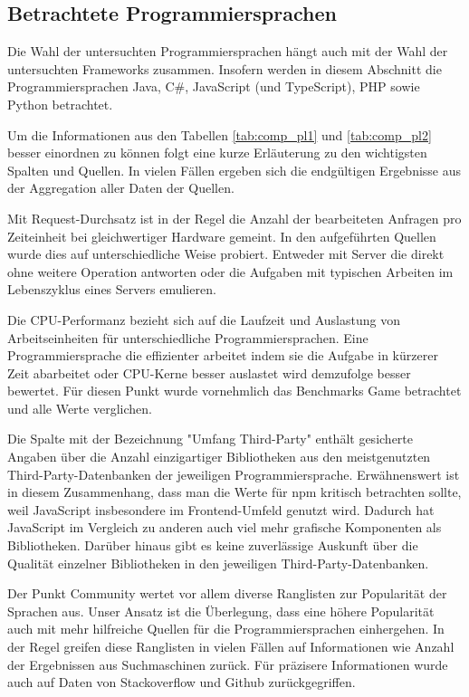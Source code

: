 \subsection{Betrachtete Programmiersprachen}
Die Wahl der untersuchten Programmiersprachen hängt auch mit der Wahl der untersuchten Frameworks zusammen. Insofern werden in diesem Abschnitt die Programmiersprachen Java, C\#, JavaScript (und TypeScript), PHP sowie Python betrachtet.

Um die Informationen aus den Tabellen \ref{tab:comp_pl1} und \ref{tab:comp_pl2} besser einordnen zu können folgt eine kurze Erläuterung zu den wichtigsten Spalten und Quellen. In vielen Fällen ergeben sich die endgültigen Ergebnisse aus der Aggregation aller Daten der Quellen.

Mit Request-Durchsatz ist in der Regel die Anzahl der bearbeiteten Anfragen pro Zeiteinheit bei gleichwertiger Hardware gemeint. In den aufgeführten Quellen wurde dies auf unterschiedliche Weise probiert. Entweder mit Server die direkt ohne weitere Operation antworten oder die Aufgaben mit typischen Arbeiten im Lebenszyklus eines Servers emulieren.

Die CPU-Performanz bezieht sich auf die Laufzeit und Auslastung von Arbeitseinheiten für unterschiedliche Programmiersprachen. Eine Programmiersprache die effizienter arbeitet indem sie die Aufgabe in kürzerer Zeit abarbeitet oder CPU-Kerne besser auslastet wird demzufolge besser bewertet. Für diesen Punkt wurde vornehmlich das Benchmarks Game betrachtet und alle Werte verglichen.

Die Spalte mit der Bezeichnung "Umfang Third-Party" enthält gesicherte Angaben über die Anzahl einzigartiger Bibliotheken aus den meistgenutzten Third-Party-Datenbanken der jeweiligen Programmiersprache. Erwähnenswert ist in diesem Zusammenhang, dass man die Werte für npm kritisch betrachten sollte, weil JavaScript insbesondere im Frontend-Umfeld genutzt wird. Dadurch hat JavaScript im Vergleich zu anderen auch viel mehr grafische Komponenten als Bibliotheken. Darüber hinaus gibt es keine zuverlässige Auskunft über die Qualität einzelner Bibliotheken in den jeweiligen Third-Party-Datenbanken.

Der Punkt Community wertet vor allem diverse Ranglisten zur Popularität der Sprachen aus. Unser Ansatz ist die Überlegung, dass eine höhere Popularität auch mit mehr hilfreiche Quellen für die Programmiersprachen einhergehen. In der Regel greifen diese Ranglisten in vielen Fällen auf Informationen wie Anzahl der Ergebnissen aus Suchmaschinen zurück. Für präzisere Informationen wurde auch auf Daten von Stackoverflow und Github zurückgegriffen.

